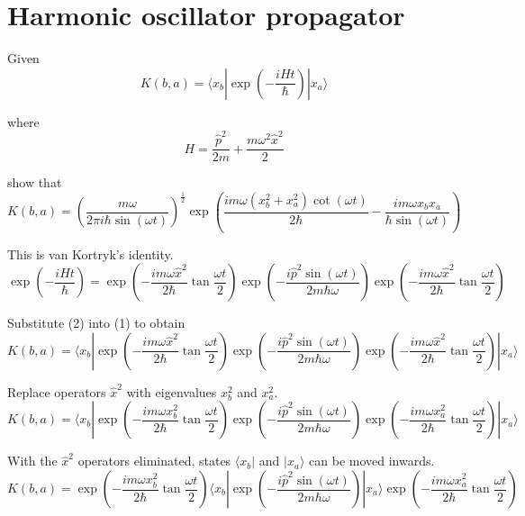 

\section*{Harmonic oscillator propagator}

Given
\begin{equation*}
K(b,a)=\langle x_b|\exp\left(-\frac{iHt}{\hbar}\right)
|x_a\rangle
\tag{1}
\end{equation*}

where
\begin{equation*}
H=\frac{\hat p^2}{2m}+\frac{m\omega^2\hat x^2}{2}
\end{equation*}

show that
\begin{equation*}
K(b,a)=\left(\frac{m\omega}{2\pi i\hbar\sin(\omega t)}\right)^\frac{1}{2}
\exp\left(\frac{im\omega(x_b^2+x_a^2)\cot(\omega t)}{2\hbar}
-\frac{im\omega x_bx_a}{\hbar\sin(\omega t)}\right)
\end{equation*}

This is van Kortryk's identity.
\begin{equation*}
\exp\left(-\frac{iHt}{\hbar}\right)=
\exp\left(-\frac{im\omega\hat x^2}{2\hbar}\tan\frac{\omega t}{2}\right)
\exp\left(-\frac{i\hat p^2\sin(\omega t)}{2m\hbar\omega}\right)
\exp\left(-\frac{im\omega\hat x^2}{2\hbar}\tan\frac{\omega t}{2}\right)
\tag{2}
\end{equation*}

Substitute (2) into (1) to obtain
\begin{equation*}
K(b,a)=\langle x_b|\exp\left(-\frac{im\omega\hat x^2}{2\hbar}\tan\frac{\omega t}{2}\right)
\exp\left(-\frac{i\hat p^2\sin(\omega t)}{2m\hbar\omega}\right)
\exp\left(-\frac{im\omega\hat x^2}{2\hbar}\tan\frac{\omega t}{2}\right)
|x_a\rangle
\end{equation*}

Replace operators $\hat x^2$ with eigenvalues $x_b^2$ and $x_a^2$.
\begin{equation*}
K(b,a)=
\langle x_b|
\exp\left(-\frac{im\omega x_b^2}{2\hbar}\tan\frac{\omega t}{2}\right)
\exp\left(-\frac{i\hat p^2\sin(\omega t)}{2m\hbar\omega}\right)
\exp\left(-\frac{im\omega x_a^2}{2\hbar}\tan\frac{\omega t}{2}\right)
|x_a\rangle
\end{equation*}

With the $\hat x^2$ operators eliminated, states $\langle x_b|$ and $|x_a\rangle$ can be moved inwards.
\begin{equation*}
K(b,a)=
\exp\left(-\frac{im\omega x_b^2}{2\hbar}\tan\frac{\omega t}{2}\right)
\langle x_b|
\exp\left(-\frac{i\hat p^2\sin(\omega t)}{2m\hbar\omega}\right)
|x_a\rangle
\exp\left(-\frac{im\omega x_a^2}{2\hbar}\tan\frac{\omega t}{2}\right)
\end{equation*}

